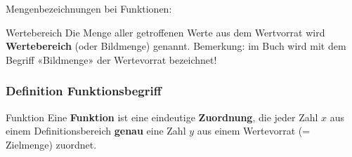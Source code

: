 \vspace{6mm}

Mengenbezeichnungen bei Funktionen:


\begin{definition}{Wertebereich}{}
Die Menge aller getroffenen Werte aus dem Wertvorrat wird \textbf{Wertebereich}
(oder Bildmenge) genannt. Bemerkung: im Buch \cite{marthaler21alg} wird
  mit dem Begriff «Bildmenge» der Wertevorrat bezeichnet!
\end{definition}

\newpage
\subsubsection{Definition Funktionsbegriff}

\begin{definition}{Funktion}{}
    Eine \textbf{Funktion} ist eine eindeutige \textbf{Zuordnung}, die jeder Zahl
    $x$ aus einem Definitionsbereich \textbf{genau} eine Zahl $y$ aus
    einem Wertevorrat (= Zielmenge) zuordnet.\\
\end{definition}


